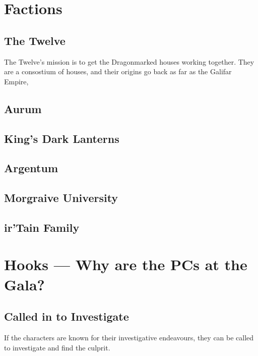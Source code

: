 \documentclass[twocolumn]{dndbook}
\begin{document}

\section{Factions}

\subsection{The Twelve}
\label{subsec:the_twelve}
The Twelve's mission is to get the Dragonmarked houses working together.
They are a consostium of houses, and their origins go back as far as the
Galifar Empire,


\subsection{Aurum}
\label{subsec:aurum}

\subsection{King's Dark Lanterns}
\label{subsec:kings_dark_lanterns}

\subsection{Argentum}
\label{subsec:argentum}

\subsection{Morgraive University}

\subsection{ir'Tain Family}


\section{Hooks --- Why are the PCs at the Gala?}

\subsection{Called in to Investigate}
If the characters are known for their investigative endeavours, they can be called to investigate and find the culprit.
\end{document}

